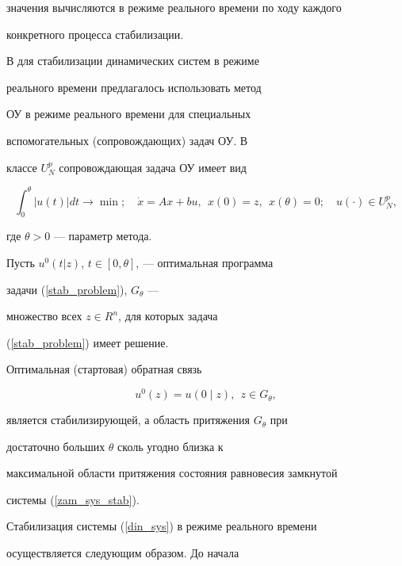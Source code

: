 значения вычисляются в режиме реального времени по ходу каждого


конкретного процесса стабилизации.





В \cite{TK} для стабилизации динамических систем в режиме


реального времени предлагалось использовать метод


ОУ в режиме реального времени для специальных


вспомогательных (сопровождающих) задач ОУ. В


классе $U_N^p$ сопровождающая задача ОУ имеет вид


\begin{equation}\label{stab_problem}


\int_0^\theta |u(t)|dt \to \min; \quad \Dot{x} = Ax + bu, \ \


x(0) = z, \ \ x(\theta) = 0; \quad u(\cdot) \in U_N^p,


\end{equation}


где $\theta > 0$ --- параметр метода.





Пусть $u^0(t|z)$, $t \in [0, \theta]$, --- оптимальная программа


задачи (\ref{stab_problem}), $G_\theta$ ---


множество всех $z \in R^n$, для которых задача


(\ref{stab_problem}) имеет решение.





Оптимальная (стартовая) обратная связь


$$


u^0(z) = u(0\mid z), \ \ z \in G_\theta,


$$


является стабилизирующей, а область притяжения $G_\theta$ при


достаточно больших $\theta$ сколь угодно близка к


максимальной области притяжения состояния равновесия замкнутой


системы (\ref{zam_sys_stab}).





Стабилизация системы (\ref{din_sys}) в режиме реального времени


осуществляется следующим образом. До начала


